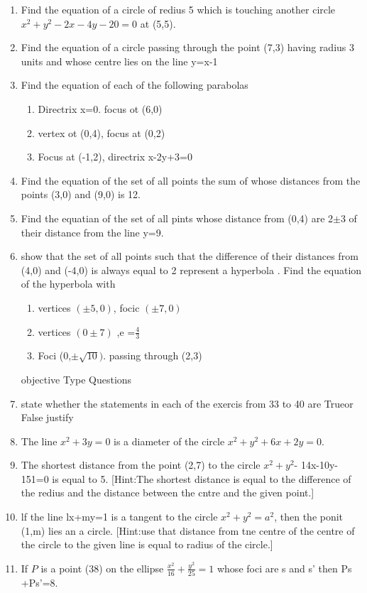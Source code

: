\documentclass[12pt]{article}
\begin{document}
\begin{enumerate}
\item Find the equation of a circle of redius 5 which is touching another circle $x^2+y^2-2x-4y-20=0$ at (5,5).
\item Find the equation of a circle passing through the point (7,3) having radius 3 units and whose centre lies on the line y=x-1
\item Find the equation of each of the following parabolas
\begin{enumerate}
\item  Directrix x=0. focus ot (6,0)
\item  vertex  ot (0,4), focus at (0,2)
\item  Focus at (-1,2), directrix x-2y+3=0
\end{enumerate}
\item Find the equation of the set of all points the sum of whose distances  from the points (3,0) and (9,0) is 12.
\item Find the equatian of the set of all pints whose distance from (0,4) are 2$\pm$3 of their distance from the line y=9.
\item show that the set of all points such that the difference of their distances from (4,0) and (-4,0) is always equal to 2 represent a hyperbola .
 Find the equation of the hyperbola with
 \begin{enumerate}
	 \item  vertices $(\pm5,0)$, focic $(\pm 7,0)$
	 \item vertices $(0\pm7)$ ,e =$\frac{4}{3}$ 
	 \item  Foci (0,$\pm\sqrt{10})$. passing through (2,3)
\end{enumerate}
objective Type Questions 
\item state whether the statements in each of the exercis from 33 to 40 are Trueor False justify
\item The line $x^2+3y=0$ is a diameter of the circle $x^2+y^2+6x+2y=0$.
\item The shortest distance from the point (2,7) to the circle $x^2+y^2$- 14x-10y-151=0 is equal to 5.
[Hint:The shortest distance is equal to the difference of the redius and the distance between  the  cntre and the given point.]
\item lf the line lx+my=1 is a tangent to the circle $x^2+y^2=a^2$, then the ponit (1,m) lies an a circle.
[Hint:use that distance from tne centre of the centre of the circle to the given line is equal to radius of the circle.]
\item If ${P}$ is a point (38) on the ellipse $\frac{x^2}{16}+\frac{y^2}{25}=1$ whose foci  are s and s' then Ps +Ps'=8.

\end{enumerate}
\end{document}
